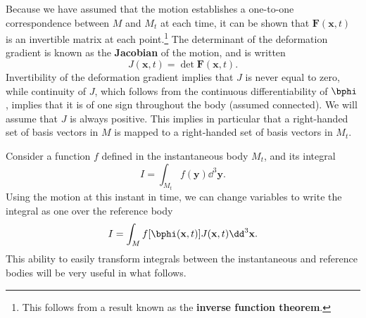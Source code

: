 Because we have assumed that the motion establishes a one-to-one correspondence between $M$ and $M_{t}$ at each time, it can 
be shown that $\mathbf{F}(\mathbf{x},t)$ is an invertible matrix at each point.\footnote{This follows from a result known as 
the \textbf{inverse function theorem}.} The determinant of the deformation gradient is known as the \textbf{Jacobian} of the
motion, and is written
\begin{equation}
J(\mathbf{x},t)=\det\mathbf{F}(\mathbf{x},t).
\label{eq:5}
\end{equation}
Invertibility of the deformation gradient implies that $J$ is never equal to zero, while continuity of $J$, which follows 
from the continuous differentiability of $\bphi$, implies that it is of one sign throughout the body (assumed connected). We will assume that $J$ is always positive. This implies in particular that a right-handed set of 
basis vectors in $M$ is mapped to a right-handed set of basis vectors in $M_{t}$.

Consider a function $f$ defined in the instantaneous body $M_{t}$, and its integral
\begin{equation}
I=\int_{M_{t}}f(\mathbf{y})\dd^{3}\mathbf{y}.
\label{eq:6}
\end{equation}
Using the motion at this instant in time, we can change variables to write the integral as one over the reference body
\begin{equation}
I=\int_{M}f[\bphi(\mathbf{x},t)]J(\mathbf{x},t)\dd^{3}\mathbf{x}.
\label{eq:7}
\end{equation}
This ability to easily transform integrals between the instantaneous and reference bodies will be very useful in what follows.


